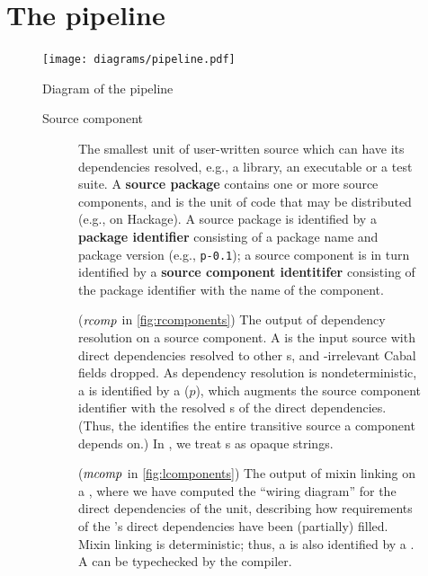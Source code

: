 \chapter{The pipeline}
\label{sec:overview}

\begin{figure}
\center\texttt{[image: diagrams/pipeline.pdf]}
\caption{Diagram of the pipeline}\label{fig:pipeline}
\end{figure}

\begin{figure}
\begin{mdframed}
\begin{description}
    \item[Source component]
        The smallest unit of user-written source which can have its
        dependencies resolved, e.g., a library, an executable or a test
        suite.  A \textbf{source package} contains one or more source
        components, and is the unit of code that may be distributed
        (e.g., on Hackage).  A source package is identified by a
        \textbf{package identifier} consisting of a package name and
        package version (e.g., \verb|p-0.1|); a source component is in
        turn identified by a \textbf{source component identitifer}
        consisting of the package identifier with the name of the
        component.
    \item[\Ccomp{}] ($\mathit{rcomp}$ in \cref{fig:rcomponents}) The output of dependency
        resolution on a source component.  A \ccomp{} is the
        input source with direct dependencies resolved to
        other \ccomp{}s, and \Backpack{}-irrelevant Cabal fields dropped.
        As dependency resolution is
        nondeterministic, a \ccomp{} is identified by a \textbf{\cid}
        ($p$), which augments the source component identifier with the
        resolved \cid{}s of the direct dependencies.  (Thus, the \cid{}
        identifies the entire transitive source a component depends on.)
        In \Backpack{}, we treat \cid{}s as opaque strings.
    \item[\Unit{}] ($\mathit{mcomp}$ in \cref{fig:lcomponents}) The output
        of mixin linking on a \ccomp{}, where we have computed the ``wiring
        diagram'' for the direct dependencies of the unit, describing how
        requirements of the \ccomp{}'s direct dependencies have been
        (partially) filled.  Mixin linking is
        deterministic; thus, a \unit{} is also identified by a \cid{}.  A
        \unit{} can be typechecked by the compiler.

\end{description}
\end{mdframed}
\end{figure}
